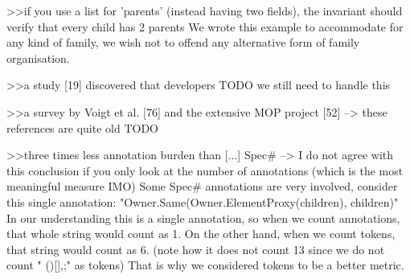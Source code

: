>>if you use a list for 'parents' (instead having two fields), the invariant should verify that every child has 2 parents
We wrote this example to accommodate for any kind of family, we wish not to offend any alternative form of family organisation.


>>a study [19] discovered that developers TODO we still need to handle this

>>a survey by Voigt et al. [76] and the extensive MOP project [52] --> these references are quite old TODO

>>three times less annotation burden than [...] Spec# --> I do not agree with this conclusion if you only look at the number of annotations (which is the most meaningful measure IMO)
Some Spec# annotations are very involved, consider this single annotation:
"Owner.Same(Owner.ElementProxy(children), children)" In our understanding this is a single annotation, so when we count annotations, that whole string would count as 1.
On the other hand, when we count tokens, that string would count as 6.
(note how it does not count 13 since we do not count " ()[]{},;" as tokens)
That is why we considered tokens to be a better metric.

